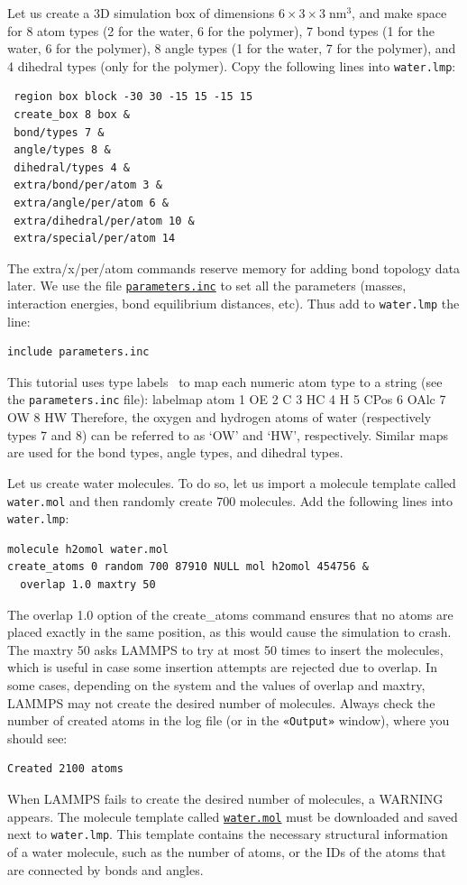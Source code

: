 \documentclass[9pt,tutorial]{livecoms}
\newcommand{\lmpcmd}[1]{\hspace{0pt}\colorbox{listing}{\textcolor{command}{\small{#1}}}\hspace{0pt}} %
\newcommand{\lmpcmdnote}[1]{\hspace{0pt}\colorbox{note_listing}{\textcolor{command}{\small{#1}}}\hspace{0pt}} %
\newcommand{\flecmd}[1]{\textcolor{command}{\texttt{#1}}} %
\newcommand{\guicmd}[1]{\textcolor{command}{\texttt{«#1»}}} %
\newcommand{\dwlcmd}[1]{\textcolor{download}{\texttt{#1}}} %
\newcommand{\filepath}{https://raw.githubusercontent.com/lammpstutorials/lammpstutorials-article/main/files/}
\begin{document}
Let us create a 3D simulation box of dimensions $6 \times 3 \times 3 \; \text{nm}^3$,
and make space for 8 atom types (2 for the water, 6 for the polymer), 7 bond types
(1 for the water, 6 for the polymer), 8 angle types (1 for the water, 7 for the polymer),
and 4 dihedral types (only for the polymer).  Copy the following lines into \flecmd{water.lmp}:
\begin{lstlisting}
 region box block -30 30 -15 15 -15 15
 create_box 8 box &
 bond/types 7 &
 angle/types 8 &
 dihedral/types 4 &
 extra/bond/per/atom 3 &
 extra/angle/per/atom 6 &
 extra/dihedral/per/atom 10 &
 extra/special/per/atom 14
\end{lstlisting}
The \lmpcmd{extra/x/per/atom} commands reserve memory for adding bond topology
data later. We use the file \href{\filepath tutorial3/parameters.inc}{\dwlcmd{parameters.inc}}
to set all the parameters (masses, interaction energies, bond equilibrium
distances, etc).  Thus add to \flecmd{water.lmp} the line:
\begin{lstlisting}
include parameters.inc
\end{lstlisting}

\begin{note}
  This tutorial uses type labels~\cite{typelabel_paper} to map each
  numeric atom type to a string (see the \flecmd{parameters.inc} file):
  \lmpcmdnote{labelmap atom 1 OE 2 C 3 HC 4 H 5 CPos 6 OAlc 7 OW 8 HW}
  Therefore, the oxygen and hydrogen atoms of water (respectively types
  7 and 8) can be referred to as `OW' and `HW', respectively.  Similar
  maps are used for the bond types, angle types, and dihedral types.
\end{note}

Let us create water molecules.  To do so, let us import a molecule template called
\flecmd{water.mol} and then randomly create 700 molecules.  Add the following
lines into \flecmd{water.lmp}:
\begin{lstlisting}
molecule h2omol water.mol
create_atoms 0 random 700 87910 NULL mol h2omol 454756 &
  overlap 1.0 maxtry 50
\end{lstlisting}
The \lmpcmd{overlap 1.0} option of the \lmpcmd{create\_atoms} command ensures
that no atoms are placed exactly in the same position, as this would cause the
simulation to crash.  The \lmpcmd{maxtry 50} asks LAMMPS to try at most 50 times
to insert the molecules, which is useful in case some insertion attempts are
rejected due to overlap.  In some cases, depending on the system and the values
of \lmpcmd{overlap} and \lmpcmd{maxtry}, LAMMPS may not create the desired number
of molecules.  Always check the number of created atoms in the \lmpcmd{log} file
(or in the \guicmd{Output} window), where you should see:
\begin{lstlisting}
Created 2100 atoms
\end{lstlisting}
When LAMMPS fails to create the desired number of molecules, a WARNING
appears.  The molecule template called
%
\href{\filepath tutorial3/water.mol}{\dwlcmd{water.mol}}
%
must be downloaded and saved
next to \flecmd{water.lmp}.  This template contains the necessary
structural information of a water molecule, such as the number of atoms,
or the IDs of the atoms that are connected by bonds and angles.
\end{document}
